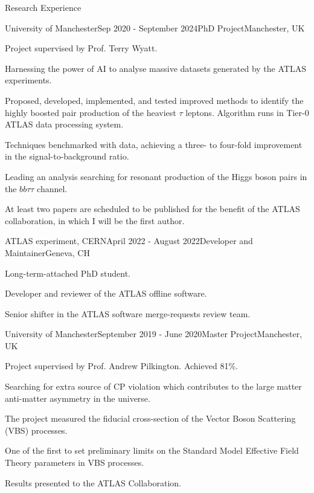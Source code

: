 \documentclass{resume} %
\begin{document}
    \begin{rSection}{Research Experience}
        \begin{rSubsection}{University of Manchester}{Sep 2020 - September 2024}{PhD Project}{Manchester, UK}
            \item   Project supervised by Prof. Terry Wyatt.
            \item   Harnessing the power of AI to analyse massive datasets generated by the ATLAS experiments. 
            \item   Proposed, developed, implemented, and tested improved methods to identify the highly boosted pair production of the heaviest $\tau$ leptons. Algorithm runs in Tier-0 ATLAS data processing system.
            \item   Techniques benchmarked with data, achieving a three- to four-fold improvement in the signal-to-background ratio. 
            \item   Leading an analysis searching for resonant production of the Higgs boson pairs in the $bb\tau\tau$ channel.
            \item   At least two papers are scheduled to be published for the benefit of the ATLAS collaboration, in which I will be the first author.
        \end{rSubsection}
        \begin{rSubsection}{ATLAS experiment, CERN}{April 2022 - August 2022}{Developer and Maintainer}{Geneva, CH}
            \item Long-term-attached PhD student.
            \item Developer and reviewer of the ATLAS offline software.
            \item Senior shifter in the ATLAS software merge-requests review team.
        \end{rSubsection}
        \begin{rSubsection}{University of Manchester}{September 2019 - June 2020}{Master Project}{Manchester, UK}
            \item   Project supervised by Prof. Andrew Pilkington. Achieved 81\%.
            \item   Searching for extra source of CP violation which contributes to the large matter anti-matter asymmetry in the universe.
            \item   The project measured the fiducial cross-section of the Vector Boson Scattering (VBS) processes.
            \item   One of the first to set preliminary limits on the Standard Model Effective Field Theory parameters in VBS processes.
            \item   Results presented to the ATLAS Collaboration. 
        \end{rSubsection}
    \end{rSection}
\end{document}
